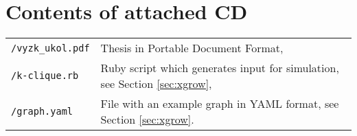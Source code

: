 \appendix
\cleardoublepage{}   %
\chapter{Contents of attached CD}

\begin{tabularx}{\textwidth}{p{7em} X}
	{\tt /vyzk\_ukol.pdf} & Thesis in Portable Document Format,\\
	{\tt /k-clique.rb} & Ruby script which generates input for simulation, see Section \ref{sec:xgrow},\\
	{\tt /graph.yaml} & File with an example graph in YAML format, see Section \ref{sec:xgrow}.
\end{tabularx}
